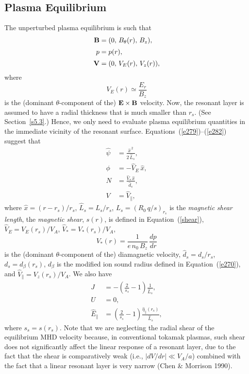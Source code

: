\documentclass[notitlepage,12pt]{article}
\begin{document}
\subsection{Plasma Equilibrium}
The unperturbed plasma equilibrium is such that
\begin{align}
{\bf B} &= (0,\,B_\theta(r),\,B_z),\\[0.5ex]
p &= p(r),\\[0.5ex]
{\bf V} &= (0,\,V_E(r),\,V_z(r)),\label{e282}
\end{align}
where 
\begin{equation}
V_E(r)\simeq \frac{E_r}{B_z}
\end{equation}
 is the (dominant $\theta$-component of the) ${\bf E}\times {\bf B}$ velocity. Now, the resonant layer is assumed to have a radial thickness that is
much smaller than $r_s$. (See Section~\ref{s5.3}.) Hence, we only need to evaluate plasma equilibrium quantities in the immediate vicinity of the resonant
surface. Equations~(\ref{e279})--(\ref{e282}) suggest that 
\begin{align}\label{e287}
\hat{\psi} &= \frac{\hat{x}^{\,2}}{2\,\hat{L}_s},\\[0.5ex]
\phi &= - \hat{V}_E\,\hat{x},\\[0.5ex]
N &= \frac{\hat{V}_\ast\,\hat{x}}{\hat{d}_s},\\[0.5ex]
V &= \hat{V}_\parallel,\label{e290}
\end{align}
where $\hat{x}=(r-r_s)/r_s$, $\hat{L}_s=L_s/r_s$, $L_s=(R_0\,q/s)_{r_s}$ is the {\em magnetic shear length},  the {\em magnetic shear}, $s(r)$, is defined in Equation~(\ref{shear}), $\hat{V}_E= V_E(r_s)/V_A$,
$\hat{V}_\ast= V_\ast(r_s)/V_A$,
\begin{equation}
V_\ast(r) = \frac{1}{e\,n_0\,B_z}\,\frac{dp}{dr}
\end{equation}
is the (dominant $\theta$-component of the) diamagnetic velocity, $\hat{d}_s=d_s/r_s$,  $d_s=d_\beta(r_s)$, $d_\beta$ is the modified  ion sound radius defined in 
Equation~(\ref{e270}), and 
 $\hat{V}_\parallel= V_z(r_s)/V_A$. We also have
 \begin{align}\label{e292}
 J &= -\left(\frac{2}{s_s}-1\right)\frac{1}{\hat{L}_s},\\[0.5ex]
 U &= 0,\label{e293}\\[0.5ex]
 \hat{E}_\parallel &=\left(\frac{2}{s_s}-1\right) \frac{\hat{\eta}_\parallel(r_s)}{\hat{L}_s},\label{e294}
\end{align}
where $s_s=s(r_s)$. 
Note that we are neglecting the radial shear of the equilibrium MHD velocity because, in conventional tokamak plasmas, such shear does not significantly affect the linear response of a  resonant
layer, due to the fact that the shear is comparatively weak (i.e., $|dV/dr|\ll V_A/a$) combined with the fact that a linear  resonant layer is
very narrow (Chen \& Morrison 1990). 
\end{document}
